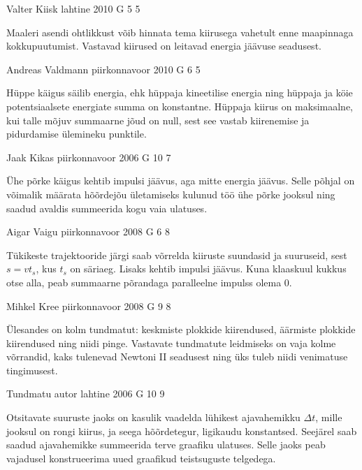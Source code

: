 \documentclass[11pt]{article}
\begin{document}
{%
{Valter Kiisk} %
{lahtine} %
{2010} %
{G 5} %
{5} %
{

\ifHint
Maaleri asendi ohtlikkust võib hinnata tema kiirusega vahetult enne maapinnaga kokkupuutumist. Vastavad kiirused on leitavad energia jäävuse seadusest.
\fi
}

{Andreas Valdmann} %
{piirkonnavoor} %
{2010} %
{G 6} %
{5} %
{

\ifHint
Hüppe käigus säilib energia, ehk hüppaja kineetilise energia ning hüppaja ja köie potentsiaalsete energiate summa on konstantne. Hüppaja kiirus on maksimaalne, kui talle mõjuv summaarne jõud on null, sest see vastab kiirenemise ja pidurdamise ülemineku punktile.
\fi
}

{Jaak Kikas} %
{piirkonnavoor} %
{2006} %
{G 10} %
{7} %
{

\ifHint
Ühe põrke käigus kehtib impulsi jäävus, aga mitte energia jäävus. Selle põhjal on võimalik määrata hõõrdejõu ületamiseks kulunud töö ühe põrke jooksul ning saadud avaldis summeerida kogu vaia ulatuses.
\fi
}

{Aigar Vaigu} %
{piirkonnavoor} %
{2008} %
{G 6} %
{8} %
{

\ifHint
Tükikeste trajektooride järgi saab võrrelda kiiruste suundasid ja suuruseid, sest $s = vt_s$, kus $t_s$ on säriaeg. Lisaks kehtib impulsi jäävus. Kuna klaaskuul kukkus otse alla, peab summaarne põrandaga paralleelne impulss olema 0.
\fi
}

{Mihkel Kree} %
{piirkonnavoor} %
{2008} %
{G 9} %
{8} %
{

\ifHint
Ülesandes on kolm tundmatut: keskmiste plokkide kiirendused, äärmiste plokkide kiirendused ning niidi pinge. Vastavate tundmatute leidmiseks on vaja kolme võrrandid, kaks tulenevad Newtoni II seadusest ning üks tuleb niidi venimatuse tingimusest.
\fi
}

{Tundmatu autor} %
{lahtine} %
{2006} %
{G 10} %
{9} %
{

\ifHint
Otsitavate suuruste jaoks on kasulik vaadelda lühikest ajavahemikku $\Delta t$, mille jooksul on rongi kiirus, ja seega hõõrdetegur, ligikaudu konstantsed. Seejärel saab saadud ajavahemikke summeerida terve graafiku ulatuses. Selle jaoks peab vajadusel konstrueerima uued graafikud teistsuguste telgedega.
\fi
}

}
\end{document}
